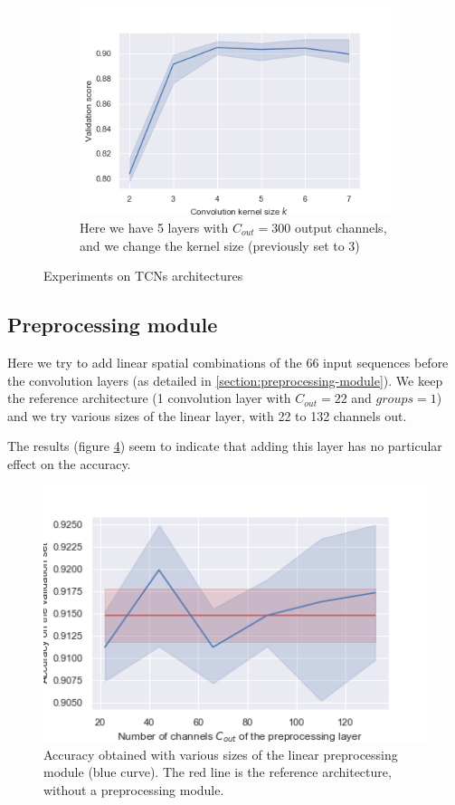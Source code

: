 \documentclass{article}
\begin{document}
\begin{figure}
\begin{subfigure}{0.45\linewidth}
        \label{fig:tcn_nb_channels}            
    \end{subfigure}
    \begin{subfigure}{0.45\linewidth}
        \includegraphics[width=\linewidth]{img/tcn_kernel_size.png}
        \caption{Here we have 5 layers with $C_{out}=300$ output channels, and we change the kernel size (previously set to 3)}
        \label{fig:tcn_kernel_size}            
    \end{subfigure}
    \caption{Experiments on TCNs architectures}
    \label{fig:tcn}
\end{figure}


\subsection{Preprocessing module}
Here we try to add linear spatial combinations of the 66 input sequences before the convolution layers (as detailed in \ref{section:preprocessing-module}). We keep the reference architecture (1 convolution layer with $C_{out}=22$ and $groups=1$) and we try various sizes of the linear layer, with 22 to 132 channels out.
\par
The results (figure \ref{fig:preprocessing}) seem to indicate that adding this layer has no particular effect on the accuracy.
\begin{figure}
    \centering
    \includegraphics[width=0.6\linewidth]{img/preprocessing.png}
    \caption{Accuracy obtained with various sizes of the linear preprocessing module (blue curve). The red line is the reference architecture, without a preprocessing module.}
    \label{fig:preprocessing}
\end{figure}
\end{document}
